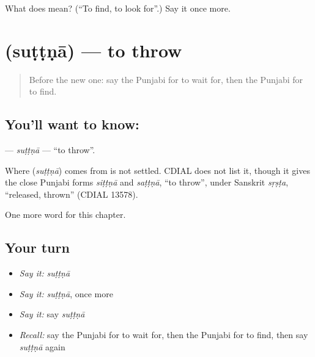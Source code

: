 \begin{tcolorbox}[breakable,colback=teal!4,colframe=teal!35!black,title={Before you move on}]
What does  mean? (\textquotedblleft{}To find, to look for\textquotedblright{}.) Say it once more.
\end{tcolorbox}
\section[\texorpdfstring{\pa{ਸੁੱਟਣਾ} (suṭṭṇā)}{ਸੁੱਟਣਾ (suṭṭṇā)}]{ (suṭṭṇā) — to throw}

\label{lesson:PA-C63-suttna}



\begin{quote}
Before the new one: say the Punjabi for to wait for, then the Punjabi for to find.
\end{quote}

\subsection*{You'll want to know: }
\textbf{} — \emph{suṭṭṇā} — \textquotedblleft{}to throw\textquotedblright{}.

\begin{cousinweb}
Where \textbf{} (\emph{suṭṭṇā}) comes from is not settled. CDIAL does not list it, though it gives the close Punjabi forms \emph{siṭṭṇā} and \emph{saṭṭṇā}, \textquotedblleft{}to throw\textquotedblright{}, under Sanskrit \emph{sṛṣṭa}, \textquotedblleft{}released, thrown\textquotedblright{} (CDIAL 13578).
\end{cousinweb}

\begin{grammarlens}[title={What you've built}]
One more word for this chapter.
\end{grammarlens}

\subsection*{Your turn}
\begin{itemize}
\raggedright
  \item \emph{Say it:} \emph{suṭṭṇā}
  \item \emph{Say it:} \emph{suṭṭṇā}, once more
  \item \emph{Say it:} say \emph{suṭṭṇā}
  \item \emph{Recall:} say the Punjabi for to wait for, then the Punjabi for to find, then say \emph{suṭṭṇā} again
\end{itemize}

